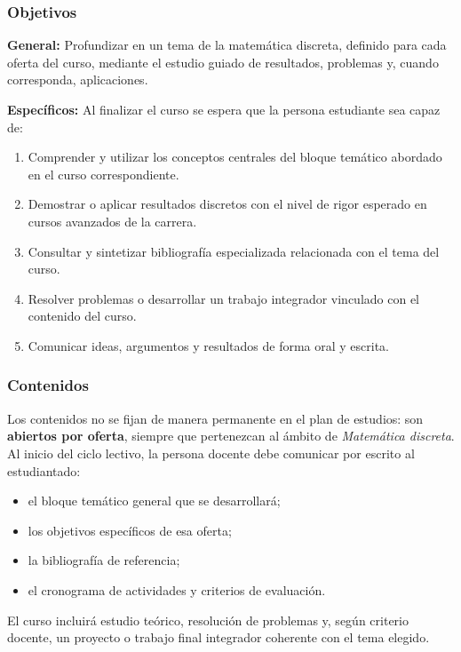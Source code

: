 \begin{refsection}
\subsubsection*{Objetivos}

\textbf{General:} Profundizar en un tema de la matemática discreta, definido para cada oferta del curso, mediante el estudio guiado de resultados, problemas y, cuando corresponda, aplicaciones.

\textbf{Específicos:} Al finalizar el curso se espera que la persona estudiante sea capaz de:

\begin{enumerate}
\item Comprender y utilizar los conceptos centrales del bloque temático abordado en el curso correspondiente.
\item Demostrar o aplicar resultados discretos con el nivel de rigor esperado en cursos avanzados de la carrera.
\item Consultar y sintetizar bibliografía especializada relacionada con el tema del curso.
\item Resolver problemas o desarrollar un trabajo integrador vinculado con el contenido del curso.
\item Comunicar ideas, argumentos y resultados de forma oral y escrita.
\end{enumerate}

\subsubsection*{Contenidos}

Los contenidos no se fijan de manera permanente en el plan de estudios: son \textbf{abiertos por oferta}, siempre que pertenezcan al ámbito de \emph{Matemática discreta}. Al inicio del ciclo lectivo, la persona docente debe comunicar por escrito al estudiantado:

\begin{itemize}
\item el bloque temático general que se desarrollará;
\item los objetivos específicos de esa oferta;
\item la bibliografía de referencia;
\item el cronograma de actividades y criterios de evaluación.
\end{itemize}

El curso incluirá estudio teórico, resolución de problemas y, según criterio docente, un proyecto o trabajo final integrador coherente con el tema elegido.


\end{refsection}
